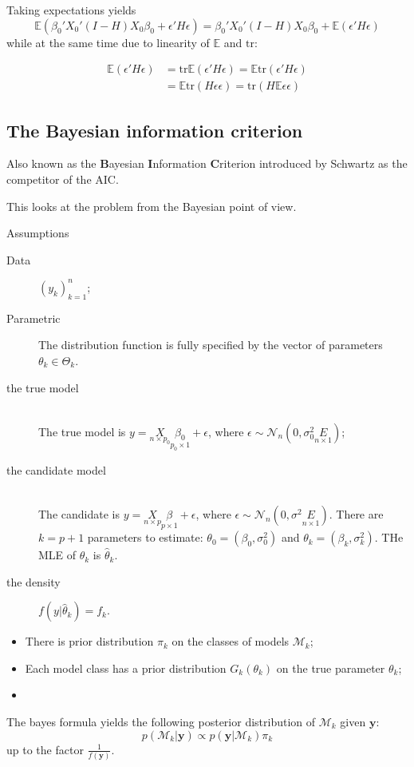 \documentclass[a4paper]{article}
\newcommand{\brac}[1]{{\left ( #1 \right )}}
\newcommand{\induc}[1]{{\left . #1 \right \vert}}
\newcommand{\Mcal}{\mathcal{M}}
\newcommand{\Ncal}{\mathcal{N}}
\newcommand{\Ex}[0]{{\mathbb{E}}}
\newcommand{\tr}{\text{tr}}
\begin{document}
Taking expectations yields
\[\Ex\brac{\beta_0'X_0'(I-H)X_0\beta_0 + \epsilon'H\epsilon} = \beta_0'X_0'(I-H)X_0\beta_0 + \Ex\brac{\epsilon'H\epsilon}\]
while at the same time due to linearity of $\Ex$ and $\tr$:

\begin{align*}
\Ex(\epsilon'H\epsilon) &= \tr\Ex(\epsilon'H\epsilon) = \Ex\tr(\epsilon'H\epsilon) \\
&= \Ex\tr(H\epsilon\epsilon) = \tr(H\Ex\epsilon\epsilon)
\end{align*}


\subsection{The Bayesian information criterion} %
\label{sub:the_bayesian_information_criterion}

Also known as the \textbf{B}ayesian \textbf{I}nformation \textbf{C}riterion introduced by Schwartz as the competitor of the AIC.

This looks at the problem from the Bayesian point of view.

Assumptions \begin{description}
	\item[Data] $\brac{y_k}_{k=1}^n$;
	\item[Parametric] The distribution function is fully specified by the vector of parameters $\theta_k\in \Theta_k$.
	\item[the true model]\hfill\\
	The true model is $y = \underset{n\times p_0}{X}\underset{p_0\times 1}{\beta_0} + \epsilon$, where $\epsilon \sim \Ncal_n\brac{0,\sigma_0^2 \underset{n\times 1}{E}}$;
	\item[the candidate model] \hfill\\
	The candidate is $y = \underset{n\times p}{X}\underset{p\times 1}{\beta} + \epsilon$, where $\epsilon \sim \Ncal_n\brac{0,\sigma^2 \underset{n\times 1}{E}}$.
	There are $k=p+1$ parameters to estimate: $\theta_0 = \brac{\beta_0,\sigma_0^2}$ and $\theta_k = \brac{\beta_k,\sigma_k^2}$. THe MLE of $\theta_k$ is $\hat{\theta}_k$.
	\item[the density] $f\brac{\induc{y}\hat{\theta}_k} = f_k$.
\end{description}

\begin{itemize}
	\item There is prior distribution $\pi_k$ on the classes of models $\Mcal_k$;
	\item Each model class has a prior distribution $G_k\brac{\theta_k}$ on the true parameter $\theta_k$;
	\item 
\end{itemize}
The bayes formula yields the following posterior distribution of $\Mcal_k$ given $\mathbf{y}$:
\[p\brac{\induc{\Mcal_k}\mathbf{y}} \propto p\brac{\induc{\mathbf{y}}\Mcal_k} \pi_k\]
up to the factor $\frac{1}{f(\mathbf{y})}$.
\end{document}
